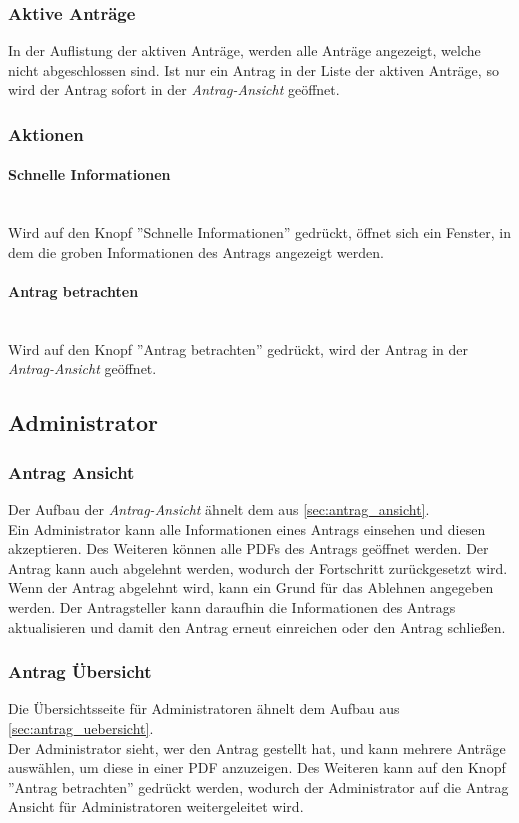 \subsubsection{Aktive Anträge}
In der Auflistung der aktiven Anträge, werden alle Anträge angezeigt, welche nicht abgeschlossen sind. Ist nur ein Antrag in der Liste der aktiven Anträge, so wird der Antrag sofort in der \textit{Antrag-Ansicht} geöffnet.
\subsubsection{Aktionen}
\paragraph{Schnelle Informationen}~\\
Wird auf den Knopf ''Schnelle Informationen'' gedrückt, öffnet sich ein Fenster, in dem die groben Informationen des Antrags angezeigt werden.
\paragraph{Antrag betrachten}~\\
Wird auf den Knopf ''Antrag betrachten'' gedrückt, wird der Antrag in der \textit{Antrag-Ansicht} geöffnet.
\newpage
\subsection{Administrator}
\subsubsection{Antrag Ansicht}
Der Aufbau der \textit{Antrag-Ansicht} ähnelt dem aus \autoref{sec:antrag_ansicht}.\\
Ein Administrator kann alle Informationen eines Antrags einsehen und diesen akzeptieren. Des Weiteren können alle PDFs des Antrags geöffnet werden. Der Antrag kann auch abgelehnt werden, wodurch der Fortschritt zurückgesetzt wird. Wenn der Antrag abgelehnt wird, kann ein Grund für das Ablehnen angegeben werden. Der Antragsteller kann daraufhin die Informationen des Antrags aktualisieren und damit den Antrag erneut einreichen oder den Antrag schließen.
\subsubsection{Antrag Übersicht}
Die Übersichtsseite für Administratoren ähnelt dem Aufbau aus \autoref{sec:antrag_uebersicht}.\\
Der Administrator sieht, wer den Antrag gestellt hat, und kann mehrere Anträge auswählen, um diese in einer PDF anzuzeigen.
Des Weiteren kann auf den Knopf ''Antrag betrachten'' gedrückt werden, wodurch der Administrator auf die Antrag Ansicht für Administratoren weitergeleitet wird.
\newpage
